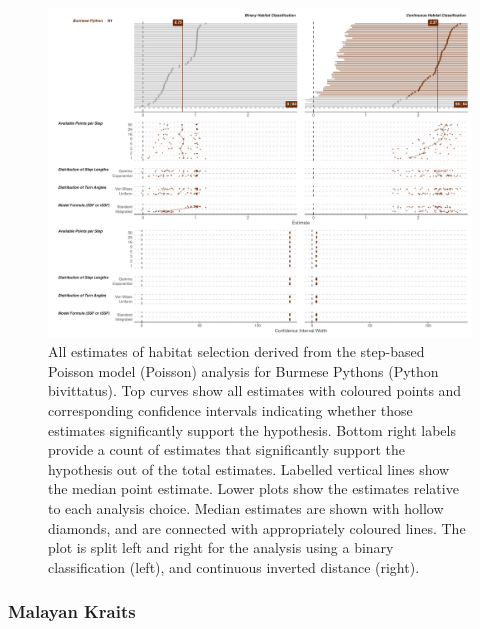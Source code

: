 \documentclass[10pt,a4paper]{article}
\begin{document}
\begin{figure}[h]
\includegraphics[width=1\linewidth]{../../figures/specCurve_Burmese Python_pois} \caption{All estimates of habitat selection derived from the step-based Poisson model (Poisson) analysis for Burmese Pythons (Python bivittatus). Top curves show all estimates with coloured points and corresponding confidence intervals indicating whether those estimates significantly support the hypothesis. Bottom right labels provide a count of estimates that significantly support the hypothesis out of the total estimates. Labelled vertical lines show the median point estimate. Lower plots show the estimates relative to each analysis choice. Median estimates are shown with hollow diamonds, and are connected with appropriately coloured lines. The plot is split left and right for the analysis using a binary classification (left), and continuous inverted distance (right).}\label{fig:specCurvePoisPYBI}
\end{figure}

\subsubsection{Malayan Kraits}\label{malayan-kraits}
\end{document}
